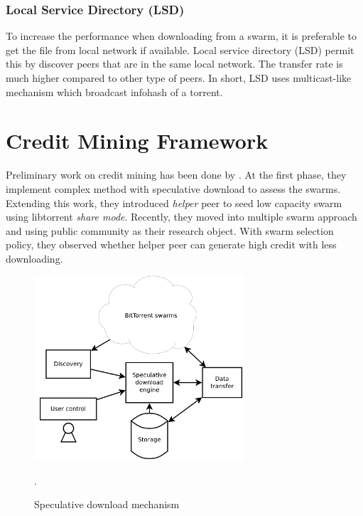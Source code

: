 \subsubsection{Local Service Directory (LSD)}
To increase the performance when downloading from a swarm, it is preferable to get the file from local network if available. Local service directory (LSD) permit this by discover peers that are in the same local network. The transfer rate is much higher compared to other type of peers. In short, LSD uses multicast-like mechanism which broadcast infohash of a torrent.
%



\section{Credit Mining Framework}
\label{section:cmprior}
Preliminary work on credit mining has been done by \citeauthor{2015:creditmining:capota} \cite{2015:creditmining:capota, 2013:investmentcm:capota, 2014:bwmarket:capota}. At the first phase, they implement complex method with speculative download to assess the swarms\cite{2013:investmentcm:capota}. Extending this work, they introduced \textit{helper} peer to seed low capacity swarm using libtorrent \textit{share mode}\cite{2014:bwmarket:capota}. Recently, they moved into multiple swarm approach and using public community as their research object. With swarm selection policy, they observed whether helper peer can generate high credit with less downloading\cite{2015:creditmining:capota}.

\begin{figure}[ht]
	\centering
	\includegraphics[width=0.7\textwidth]{pics/SDE2013.png}
	\caption{Speculative download mechanism \cite{2013:investmentcm:capota}}.
	\label{fig:sde13}
\end{figure}

